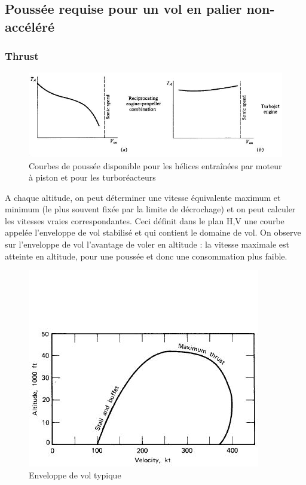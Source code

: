 \documentclass{report}
\begin{document}
\subsection{Poussée requise pour un vol en palier non-accéléré}

\subsubsection{Thrust}
\begin{figure}[h!]
    \centering
    \includegraphics[scale=0.7]{7.JPG}
    \caption{Courbes de poussée disponible pour les hélices entraînées par moteur à piston et pour les turboréacteurs}
    \label{7}
\end{figure}

A chaque altitude, on peut déterminer une vitesse équivalente maximum et minimum (le plus souvent fixée par la limite de décrochage) et on peut calculer les vitesses vraies correspondantes. Ceci définit dans le plan H,V une courbe appelée l’enveloppe de vol stabilisé et qui contient le domaine de vol. On observe sur l’enveloppe de vol l’avantage de voler en altitude : la vitesse maximale est atteinte en altitude, pour une poussée et donc une consommation plus faible.

\begin{figure}[h!]
    \centering
    \includegraphics{8.JPG}
    \caption{Enveloppe de vol typique}
    \label{8}
\end{figure}
\end{document}
